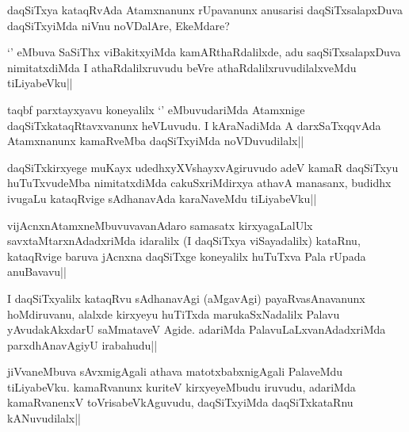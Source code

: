 
\begin{artha}
daqSiTxya kataqRvAda Atamxnanunx rUpavanunx anusarisi daqSiTxsalapxDuva daqSiTxyiMda niVnu noVDalAre, EkeMdare?  
\end{artha}

\begin{artha}
`\stext ' eMbuva SaSiThx viBakitxyiMda kamARthaRdalilxde, adu saqSiTxsalapxDuva nimitatxdiMda I athaRdalilxruvudu beVre athaRdalilxruvudilalxveMdu tiLiyabeVku||
\end{artha}


\begin{artha}
taqbf parxtayxyavu koneyalilx `\stext '  eMbuvudariMda Atamxnige daqSiTxkataqRtavxvanunx heVLuvudu. I kAraNadiMda A darxSaTxqqvAda Atamxnanunx kamaRveMba daqSiTxyiMda noVDuvudilalx||
\end{artha}


\begin{artha}
daqSiTxkirxyege muKayx udedhxyXVshayxvAgiruvudo adeV kamaR daqSiTxyu huTuTxvudeMba nimitatxdiMda cakuSxriMdirxya athavA manasanx, budidhx ivugaLu kataqRvige sAdhanavAda karaNaveMdu tiLiyabeVku||
\end{artha}


\begin{artha}
vijAcnxnAtamxneMbuvuvavanAdaro samasatx kirxyagaLalUlx savxtaMtarxnAdadxriMda idaralilx (I daqSiTxya viSayadalilx) kataRnu, kataqRvige baruva jAcnxna daqSiTxge koneyalilx huTuTxva Pala rUpada anuBavavu||
\end{artha}

\begin{artha}
I daqSiTxyalilx kataqRvu sAdhanavAgi (aMgavAgi) payaRvasAnavanunx hoMdiruvanu, alalxde kirxyeyu huTiTxda marukaSxNadalilx Palavu yAvudakAkxdarU saMmataveV Agide. adariMda PalavuLaLxvanAdadxriMda parxdhAnavAgiyU irabahudu||
\end{artha}


\begin{artha}
jiVvaneMbuva sAvxmigAgali athava matotxbabxnigAgali PalaveMdu tiLiyabeVku. kamaRvanunx kuriteV kirxyeyeMbudu iruvudu, adariMda kamaRvanenxV toVrisabeVkAguvudu, daqSiTxyiMda daqSiTxkataRnu kANuvudilalx||
\end{artha}

